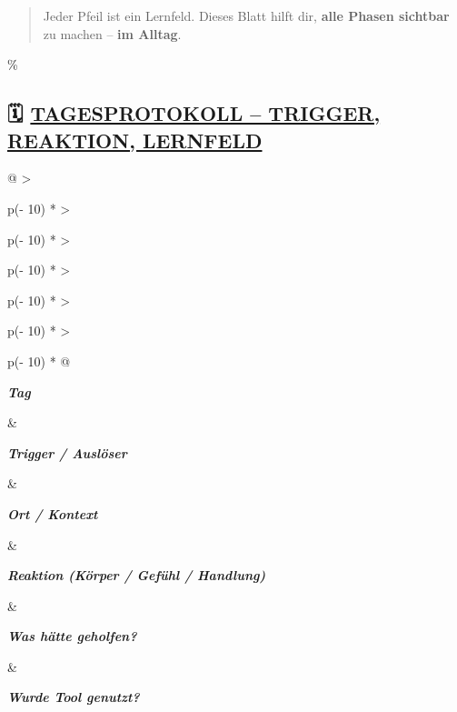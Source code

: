 \begin{quote}
Jeder Pfeil ist ein Lernfeld. Dieses Blatt hilft dir, \textbf{alle Phasen sichtbar} zu machen -- \textbf{im Alltag}.
\end{quote}

\hypertarget{tagesprotokoll-trigger-reaktion-lernfeld}{\%
\subsection{\texorpdfstring{🗓️ \textbf{\ul{TAGESPROTOKOLL -- TRIGGER, REAKTION, LERNFELD}}}{🗓️ TAGESPROTOKOLL -- TRIGGER, REAKTION, LERNFELD}}\label{tagesprotokoll-trigger-reaktion-lernfeld}}

\begin{longtable}[]{@{}
  >{\raggedright\arraybackslash}p{(\columnwidth - 10\tabcolsep) * }
  >{\raggedright\arraybackslash}p{(\columnwidth - 10\tabcolsep) * }
  >{\raggedright\arraybackslash}p{(\columnwidth - 10\tabcolsep) * }
  >{\raggedright\arraybackslash}p{(\columnwidth - 10\tabcolsep) * }
  >{\raggedright\arraybackslash}p{(\columnwidth - 10\tabcolsep) * }
  >{\raggedright\arraybackslash}p{(\columnwidth - 10\tabcolsep) * }@{}}
\toprule\noalign{}
\begin{minipage}[b]{\linewidth}\raggedright
\emph{\textbf{Tag}}
\end{minipage} \& \begin{minipage}[b]{\linewidth}\raggedright
\emph{\textbf{Trigger / Auslöser}}
\end{minipage} \& \begin{minipage}[b]{\linewidth}\raggedright
\emph{\textbf{Ort / Kontext}}
\end{minipage} \& \begin{minipage}[b]{\linewidth}\raggedright
\emph{\textbf{Reaktion (Körper / Gefühl / Handlung)}}
\end{minipage} \& \begin{minipage}[b]{\linewidth}\raggedright
\emph{\textbf{Was hätte geholfen?}}
\end{minipage} \& \begin{minipage}[b]{\linewidth}\raggedright
\emph{\textbf{Wurde Tool genutzt?}}
\end{minipage} \\
\midrule\noalign{}
\endhead
\bottomrule\noalign{}
\endlastfoot

\end{longtable}
